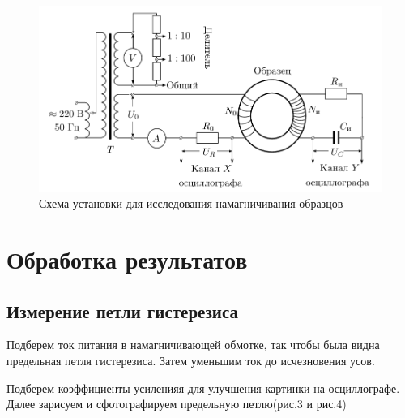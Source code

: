 \documentclass[a4paper]{article}
\begin{document}
\begin{figure}[h!]
	\centering
	\includegraphics[width=12cm]{pick2.PNG}
	\caption{Схема установки для исследования намагничивания образцов}
	\label{fig:Holl2}
\end{figure}


\section{Обработка результатов}

\subsection{Измерение петли гистерезиса}

Подберем ток питания в намагничивающей обмотке, так чтобы была видна предельная петля гистерезиса. Затем уменьшим ток до исчезновения усов.\par
Подберем коэффициенты усиленияя для улучшения картинки на осциллографе. Далее зарисуем и сфотографируем предельную петлю(рис.3 и рис.4)
\end{document}

